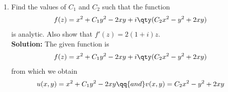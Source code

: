 \begin{enumerate}
\begin{multicols}{2}
				\begin{align*}
					\pdv{u}{y}&=\pdv{y}\qty(\sin{x}\cosh{y}) \\
						&=\sin{x}\sinh{y}
				\end{align*}
			\end{multicols}
			\vspace{-3ex}
			
			\begin{multicols}{2}
				\begin{align*}
					\pdv{v}{x}&=\pdv{x}\qty(\cos{x}\sinh{y}) \\
						&=-\sin{x}\sinh{y}
				\end{align*}
				
				\begin{align*}
					\pdv{v}{y}&=\pdv{y}\qty(\cos{x}\sinh{y}) \\
						&=\cos{x}\cosh{y}
				\end{align*}
			\end{multicols}
			From the above partial derivatives, we find that
			\begin{align*}
				\pdv{u}{x}=\pdv{v}{y}\qq{and}\pdv{u}{y}=-\pdv{v}{x}
			\end{align*}
			Hence the Cauchy-Riemann conditions are satisfied. Also the partial derivatives $\pdv{u}{x}$, $\pdv{u}{y}$, $\pdv{v}{x}$ and $\pdv{v}{y}$ are continuous everywhere.
			
			Therefore the complex function $f(z)=\sin{z}$ is analytic everywhere.
			
			Now, we evaluate the derivative as follows
			\begin{align*}
				\dv{z}\qty(\sin{z})&=\pdv{u}{x}+i\pdv{v}{x} \\
					&=\cos{x}\cosh{y}+i\qty(-\sin{x}\sinh{y}) \\
					&=\cos{x}\cosh{y}-\sin{x}\qty(i\sinh{y}) \\
					&=\cos{x}\qty(\cos{iy})-\sin{x}\qty(\sin{iy}) \\
					&=\cos\qty(x+iy) \\
				\implies\dv{z}\qty(\sin{z})&=\cos{z}
			\end{align*}
			
			\item Find the values of $C_1$ and $C_2$ such that the function
			\begin{align*}
				f(z)=x^2+C_1y^2-2xy+i\qty(C_2x^2-y^2+2xy)
			\end{align*}
			is analytic. Also show that $f'(z)=2(1+i)z$.\\
			\textbf{Solution:} The given function is
			\begin{align*}
				f(z)=x^2+C_1y^2-2xy+i\qty(C_2x^2-y^2+2xy)
			\end{align*}
			from which we obtain
			\begin{align*}
				u(x,y)=x^2+C_1y^2-2xy\qq{and}v(x,y)=C_2x^2-y^2+2xy
			\end{align*}
			

\end{enumerate}
